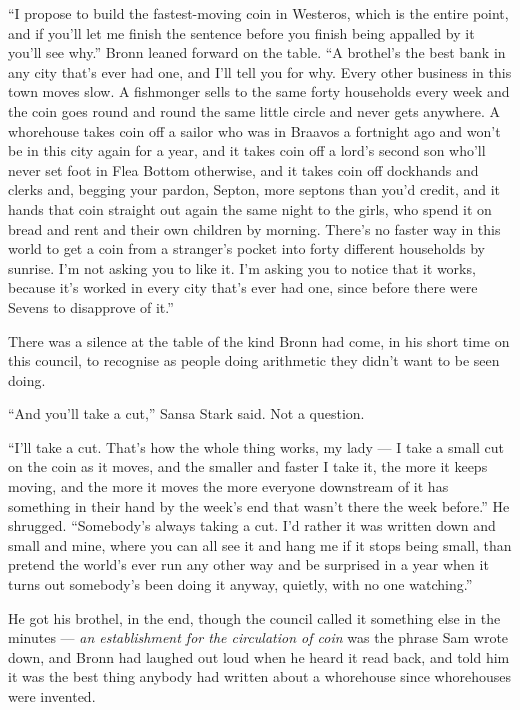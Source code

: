 “I propose to build the fastest-moving coin in Westeros, which is the entire point, and if you’ll let me finish the sentence before you finish being appalled by it you’ll see why.” Bronn leaned forward on the table. “A brothel’s the best bank in any city that’s ever had one, and I’ll tell you for why. Every other business in this town moves slow. A fishmonger sells to the same forty households every week and the coin goes round and round the same little circle and never gets anywhere. A whorehouse takes coin off a sailor who was in Braavos a fortnight ago and won’t be in this city again for a year, and it takes coin off a lord’s second son who’ll never set foot in Flea Bottom otherwise, and it takes coin off dockhands and clerks and, begging your pardon, Septon, more septons than you’d credit, and it hands that coin straight out again the same night to the girls, who spend it on bread and rent and their own children by morning. There’s no faster way in this world to get a coin from a stranger’s pocket into forty different households by sunrise. I’m not asking you to like it. I’m asking you to notice that it works, because it’s worked in every city that’s ever had one, since before there were Sevens to disapprove of it.”

There was a silence at the table of the kind Bronn had come, in his short time on this council, to recognise as people doing arithmetic they didn’t want to be seen doing.

“And you’ll take a cut,” Sansa Stark said. Not a question.

“I’ll take a cut. That’s how the whole thing works, my lady — I take a small cut on the coin as it moves, and the smaller and faster I take it, the more it keeps moving, and the more it moves the more everyone downstream of it has something in their hand by the week’s end that wasn’t there the week before.” He shrugged. “Somebody’s always taking a cut. I’d rather it was written down and small and mine, where you can all see it and hang me if it stops being small, than pretend the world’s ever run any other way and be surprised in a year when it turns out somebody’s been doing it anyway, quietly, with no one watching.”

\sceneBreak

He got his brothel, in the end, though the council called it something else in the minutes — \textit{an establishment for the circulation of coin} was the phrase Sam wrote down, and Bronn had laughed out loud when he heard it read back, and told him it was the best thing anybody had written about a whorehouse since whorehouses were invented.

